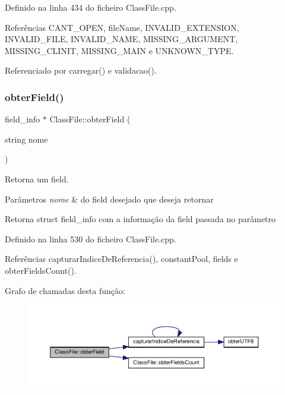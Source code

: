 Definido na linha 434 do ficheiro Class\+File.\+cpp.



Referências C\+A\+N\+T\+\_\+\+O\+P\+EN, file\+Name, I\+N\+V\+A\+L\+I\+D\+\_\+\+E\+X\+T\+E\+N\+S\+I\+ON, I\+N\+V\+A\+L\+I\+D\+\_\+\+F\+I\+LE, I\+N\+V\+A\+L\+I\+D\+\_\+\+N\+A\+ME, M\+I\+S\+S\+I\+N\+G\+\_\+\+A\+R\+G\+U\+M\+E\+NT, M\+I\+S\+S\+I\+N\+G\+\_\+\+C\+L\+I\+N\+IT, M\+I\+S\+S\+I\+N\+G\+\_\+\+M\+A\+IN e U\+N\+K\+N\+O\+W\+N\+\_\+\+T\+Y\+PE.



Referenciado por carregar() e validacao().

\mbox{\label{classClassFile_a1ae90b1662ca222c9910c14997b20eaa}} 
\subsubsection{\texorpdfstring{obter\+Field()}{obterField()}}
{\footnotesize\ttfamily field\+\_\+info $\ast$ Class\+File\+::obter\+Field (\begin{DoxyParamCaption}\item[{string}]{nome }\end{DoxyParamCaption})}



Retorna um field. 


\begin{DoxyParams}{Parâmetros}
{\em nome} & do field desejado que deseja retornar \\
\hline
\end{DoxyParams}
\begin{DoxyReturn}{Retorna}
struct field\+\_\+info com a informação da field passada no parâmetro 
\end{DoxyReturn}


Definido na linha 530 do ficheiro Class\+File.\+cpp.



Referências capturar\+Indice\+De\+Referencia(), constant\+Pool, fields e obter\+Fields\+Count().

Grafo de chamadas desta função\+:
\nopagebreak
\begin{figure}[H]
\begin{center}
\leavevmode
\includegraphics[width=350pt]{classClassFile_a1ae90b1662ca222c9910c14997b20eaa_cgraph}
\end{center}
\end{figure}
\mbox{\label{classClassFile_ac3aabaa918413884416692b29165b463}} 
